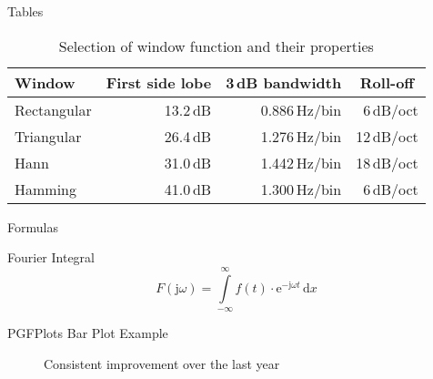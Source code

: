 \documentclass[newPxFont]{beamer}
\begin{document}
\begin{frame}{Tables}
\begin{table}[]
    \caption{Selection of window function and their properties}
    \begin{tabular}[]{lrrr}
        \toprule
        \textbf{Window}         & \multicolumn{1}{c}{\textbf{First side lobe}}
                            & \multicolumn{1}{c}{\textbf{3\,dB bandwidth}}
                            & \multicolumn{1}{c}{\textbf{Roll-off}} \\
        \midrule
        Rectangular             & 13.2\,dB  & 0.886\,Hz/bin & 6\,dB/oct     \\[0.25em]
        Triangular              & 26.4\,dB  & 1.276\,Hz/bin & 12\,dB/oct    \\[0.25em]
        Hann                    & 31.0\,dB  & 1.442\,Hz/bin & 18\,dB/oct    \\[0.25em]
        Hamming                 & 41.0\,dB  & 1.300\,Hz/bin & 6\,dB/oct     \\
        \bottomrule
    \end{tabular}
    \label{tab:WindowFunctions}
\end{table}
\end{frame}


\begin{frame}{Formulas}
\begin{block}{Fourier Integral}
\[
F(\textrm{j}\omega) = \displaystyle \int \limits_{-\infty}^{\infty} \! f(t)\cdot\textrm{e}^{-\textrm{j}\omega t}  \, \mathrm{d} x
\]
\end{block}
\end{frame}


\begin{frame}{PGFPlots Bar Plot Example}
    \begin{figure}[h]
        \centering
        \caption{Consistent improvement over the last year}
        \end{figure}
\end{frame}
\end{document}
